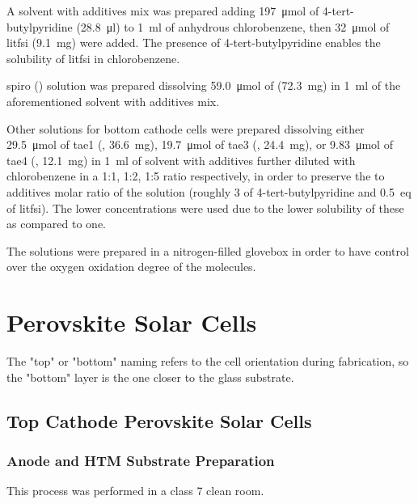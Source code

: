 		A solvent with additives mix was prepared adding \SI{197}{\umol} of 4-tert-butylpyridine (\SI{28.8}{\ul}) to \SI{1}{\ml} of anhydrous chlorobenzene, then \SI{32}{\umol} of \gls{litfsi} (\SI{9.1}{\mg}) were added. The presence of 4-tert-butylpyridine enables the solubility of \gls{litfsi} in chlorobenzene.
		
		\Glsdesc{spiro} (\spiro)  solution was prepared dissolving \SI{59.0}{\umol} of \spiro (\SI{72.3}{\mg}) in \SI{1}{\ml} of the aforementioned solvent with additives mix.

		Other  solutions for bottom cathode cells were prepared dissolving either \SI{29.5}{\umol} of \glsdesc{tae1} (, \SI{36.6}{\mg}), \SI{19.7}{\umol} of \glsdesc{tae3} (, \SI{24.4}{\mg}), or \SI{9.83}{\umol} of \glsdesc{tae4} (, \SI{12.1}{\mg}) in \SI{1}{\ml} of solvent with additives further diluted with chlorobenzene in a 1:1, 1:2, 1:5 ratio respectively, in order to preserve the  to additives molar ratio of the \spiro solution (roughly \SI{3}{\eq} of 4-tert-butylpyridine and \SI{0.5}{eq} of \gls{litfsi}). The lower concentrations were used due to the lower solubility of these  as compared to \spiro one.
		
		The solutions were prepared in a nitrogen-filled glovebox in order to have control over the oxygen oxidation degree of the molecules.

\section{Perovskite Solar Cells}

	The "top" or "bottom" naming refers to the cell orientation during fabrication, so the "bottom" layer is the one closer to the glass substrate.

	\subsection{Top Cathode Perovskite Solar Cells}

		\subsubsection{Anode and HTM Substrate Preparation}
			This process was performed in a class 7 clean room.
		
